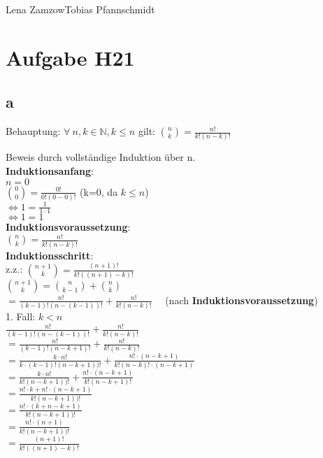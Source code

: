 \documentclass[11pt,a4paper]{article}
\begin{document}
                {Lena Zamzow}{Tobias Pfannschmidt}{}{}{}


\section*{Aufgabe H21}
\subsection*{a}
Behauptung: $\forall~n,k \in \mathbb{N}, k \leq n $ gilt: 
$\binom{n}{k} = \frac{n!}{k!(n-k)!}$


Beweis durch vollständige Induktion über n.\\

\textbf{Induktionsanfang}: \\
$ n = 0$ \\
$\binom{0}{0} = \frac{0!}{0!(0-0)!}$   (k=0, da $k \leq n$) \\
$\Leftrightarrow 1 = \frac{1}{1\cdot1}$ \\
$\Leftrightarrow 1 = 1$   \checkmark \\

\textbf{Induktionsvoraussetzung}: \\
$\binom{n}{k} = \frac{n!}{k!(n-k)!}$ \\

\textbf{Induktionsschritt}: \\
z.z.: $\binom{n+1}{k} = \frac{(n+1)!}{k!((n+1)-k)!}$ \\

$\binom{n+1}{k} = \binom{n}{k-1} + \binom{n}{k}$ \\
$= \frac{n!}{(k-1)!(n-(k-1))!} + \frac{n!}{k!(n-k)!}$ ~~(nach \textbf{Induktionsvoraussetzung}) \\

1. Fall: $ k < n$ \\

$\frac{n!}{(k-1)!(n-(k-1))!} + \frac{n!}{k!(n-k)!}$ \\
$= \frac{n!}{(k-1)!(n-k+1)!} + \frac{n!}{k!(n-k)!}$ \\
$= \frac{k \cdot n!}{k \cdot (k-1)! (n-k+1))!} + \frac{n!\cdot (n-k+1)}{k!(n-k)! \cdot (n-k+1)}$ \\
$= \frac{k \cdot n!}{k! (n-k+1))!} + \frac{n!\cdot (n-k+1)}{k!(n-k+1)!}$ \\
$= \frac{n! \cdot k + n!\cdot (n-k+1)}{k! (n-k+1))!}$ \\
$= \frac{n! \cdot (k+n-k+1)}{k! (n-k+1))!}$ \\
$= \frac{n! \cdot (n+1)}{k! (n-k+1))!}$ \\
$= \frac{(n+1)!}{k! ((n+1)-k)!}$ \\
\end{document}
